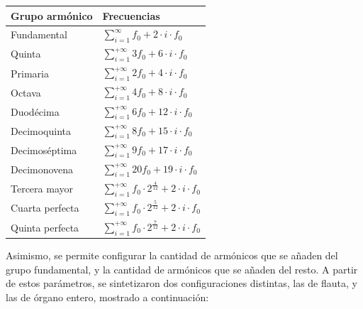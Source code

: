 \begin{table}[H]
\centering
\begin{tabular}{@{}ll@{}}
\toprule
\textbf{Grupo armónico} & Frecuencias \\ \midrule
Fundamental & $\sum_{i = 1}^{\infty} f_0 + 2\cdot i \cdot f_0$ \\ 
Quinta & $\sum_{i = 1}^{+\infty} 3f_0 + 6\cdot i \cdot f_0$ \\ 
 Primaria& $\sum_{i = 1}^{+\infty} 2f_0 + 4\cdot i \cdot f_0$ \\ 
 Octava& $\sum_{i = 1}^{+\infty} 4f_0 + 8\cdot i \cdot f_0$ \\ 
 Duodécima& $\sum_{i = 1}^{+\infty} 6f_0 + 12\cdot i \cdot f_0$ \\ 
 Decimoquinta& $\sum_{i = 1}^{+\infty} 8f_0 + 15\cdot i \cdot f_0$ \\ 
 Decimoséptima& $\sum_{i = 1}^{+\infty} 9f_0 + 17\cdot i \cdot f_0$ \\ 
 Decimonovena& $\sum_{i = 1}^{+\infty} 20f_0 + 19\cdot i \cdot f_0$ \\ 
 Tercera mayor& $\sum_{i = 1}^{+\infty} f_0 \cdot 2^{\frac{4}{12}} + 2\cdot i \cdot f_0$ \\ 
 Cuarta perfecta& $\sum_{i = 1}^{+\infty} f_0 \cdot 2^{\frac{5}{12}} + 2\cdot i \cdot f_0$ \\ 
 Quinta perfecta& $\sum_{i = 1}^{+\infty} f_0 \cdot 2^{\frac{7}{12}} + 2\cdot i \cdot f_0$ \\ \bottomrule
\end{tabular}
\end{table}

Asimismo, se permite configurar la cantidad de armónicos que se añaden del grupo fundamental, y la cantidad de armónicos que se añaden del resto. A partir de estos parámetros, se sintetizaron dos configuraciones distintas, las de flauta, y las de órgano entero, mostrado a continuación:

